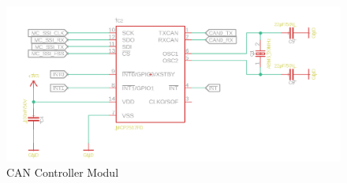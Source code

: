 \begin{figure}[H]
	\begin{center}
		\includegraphics[width=1\textwidth]{./images/mcp_eagle.jpg}
	\end{center}
	\vspace{-5pt}
	\caption[CAN Controller Modul]{CAN Controller Modul} %
	\label{fig:can:controller}
	\vspace{-5pt}
\end{figure}

